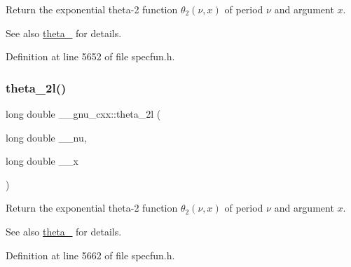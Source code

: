 Return the exponential theta-\/2 function $ \theta_2(\nu,x) $ of period $ \nu $ and argument $ x $.

\begin{DoxySeeAlso}{See also}
\hyperlink{group__gnu__math__spec__func_ga16f278edeb2842d614bae1f1ae2d0256}{theta\+\_} for details. 
\end{DoxySeeAlso}


Definition at line 5652 of file specfun.\+h.

\mbox{\label{group__gnu__math__spec__func_gac5a30c772d4888442665945e7f3fa017}} 
\subsubsection{\texorpdfstring{theta\+\_\+2l()}{theta\_2l()}}
{\footnotesize\ttfamily long double \+\_\+\+\_\+gnu\+\_\+cxx\+::theta\+\_\+2l (\begin{DoxyParamCaption}\item[{long double}]{\+\_\+\+\_\+nu,  }\item[{long double}]{\+\_\+\+\_\+x }\end{DoxyParamCaption})\hspace{0.3cm}{\ttfamily [inline]}}

Return the exponential theta-\/2 function $ \theta_2(\nu,x) $ of period $ \nu $ and argument $ x $.

\begin{DoxySeeAlso}{See also}
\hyperlink{group__gnu__math__spec__func_ga16f278edeb2842d614bae1f1ae2d0256}{theta\+\_} for details. 
\end{DoxySeeAlso}


Definition at line 5662 of file specfun.\+h.

\mbox{\label{group__gnu__math__spec__func_ga146c3b8e86991e164d4bf143cda5f0fc}} 
